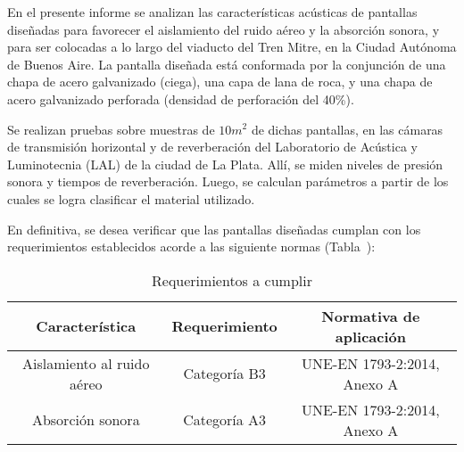 \par En el presente informe se analizan las características acústicas de pantallas diseñadas para favorecer el aislamiento del ruido aéreo y la absorción sonora, y para ser colocadas a lo largo del viaducto del Tren Mitre, en la Ciudad Autónoma de Buenos Aire. 
La pantalla diseñada está conformada por la conjunción de  una chapa de acero galvanizado (ciega), una capa de lana de
roca, y una chapa de acero galvanizado perforada (densidad de perforación del 40\%).

\par Se realizan pruebas sobre muestras de $10 m^2$ de dichas pantallas, en las cámaras de transmisión horizontal y de reverberación del Laboratorio de Acústica y Luminotecnia (LAL) de la ciudad de La Plata. Allí, se miden niveles de presión sonora y tiempos de reverberación. Luego, se calculan parámetros a partir de los cuales se logra clasificar el material utilizado. 

\par En definitiva, se desea verificar que las pantallas diseñadas cumplan con los requerimientos establecidos acorde a las siguiente normas (Tabla~):

\begin{table}[!h]
\setlength\arrayrulewidth{1pt}

    \centering
    \begin{tabular}{|c|c|c|} \hline
        \textbf{Característica} & \textbf{Requerimiento} & \textbf{Normativa de aplicación}\\ \hline
        Aislamiento al ruido aéreo & Categoría B3 & UNE-EN 1793-2:2014, Anexo A\\ \hline
        Absorción sonora & Categoría A3 & UNE-EN 1793-2:2014, Anexo A \\ \hline
    \end{tabular}
    \caption{Requerimientos a cumplir}
    \label{tab:requerimientos_a_cumplir}
\end{table}


